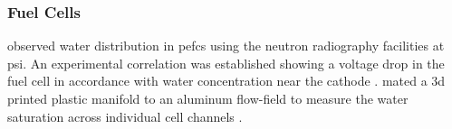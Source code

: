 \documentclass[../../main.tex]{subfiles}%
\begin{document}
%
    \subsubsection{Fuel Cells}%
    \label{sec:chapter-1:motivation:fuel-cells}%
    \citeauthor*{Boillat_2008} observed water distribution in \glspl{pefc} using the neutron radiography facilities at \gls{psi}.
    An experimental correlation was established showing a voltage drop in the fuel cell in accordance with water concentration near the cathode \cite{Boillat_2008}.
    \citeauthor*{Santamaria_2015} mated a \gls{3d} printed plastic manifold to an aluminum flow-field to measure the water saturation across individual cell channels \cite{Santamaria_2015}.    
\end{document}
